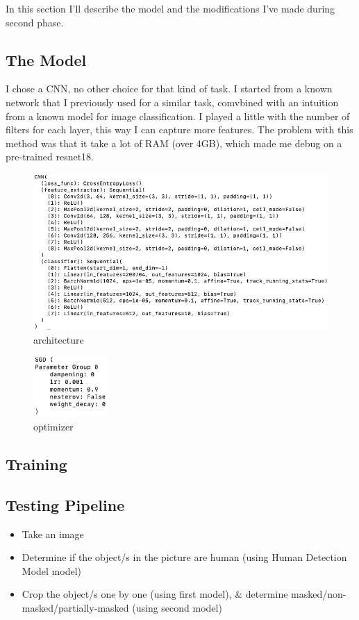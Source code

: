In this section I'll describe the model and the modifications I've made during second phase.
\subsection{The Model}
I chose a CNN, no other choice for that kind of task.
I started from a known network that I previously used for a similar task, comvbined with an intuition from a known model
for image classification.
I played a little with the number of filters for each layer, this way I can capture more features.
The problem with this method was that it take a lot of RAM (over 4GB), which made me debug on a pre-trained resnet18.
\begin{figure}[H]
    \centering
     \includegraphics[scale=0.5]{images/architecture}
    \caption{architecture}
    \label{fig:architecture}
\end{figure}

\begin{figure}[H]
    \centering
    \includegraphics[width=0.25\textwidth]{images/optimizer}
    \caption{optimizer}
    \label{fig:optimizer}
\end{figure}

\subsection{Training}

\subsection{Testing Pipeline}
\begin{itemize}
    \item Take an image
    \item Determine if the object/s in the picture are human (using Human Detection Model model)
    \item Crop the object/s one by one (using first model), \& determine masked/non-masked/partially-masked (using second model)
\end{itemize}
